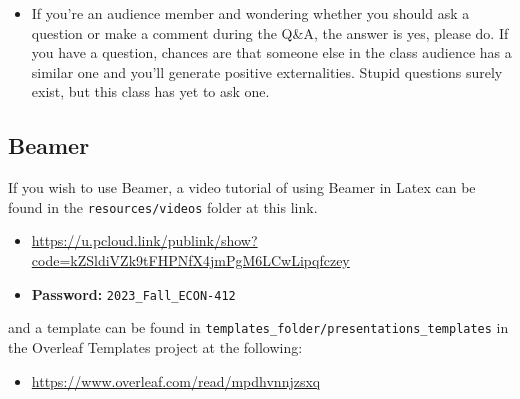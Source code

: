 \begin{itemize}
    \item If you're an audience member and wondering whether you should ask a question or make a comment during the Q\&A, the answer is yes, please do. If you have a question, chances are that someone else in the class audience has a similar one and you'll generate positive externalities. Stupid questions surely exist, but this class has yet to ask one. 
\end{itemize}

\subsection{Beamer}\label{sec:beamer}
If you wish to use Beamer, a video tutorial of using Beamer in Latex can be found in the \verb+resources/videos+ folder at this link.

\begin{itemize}
    \item \href{https://u.pcloud.link/publink/show?code=kZSldiVZk9tFHPNfX4jmPgM6LCwLipqfczey}{https://u.pcloud.link/publink/show?code=kZSldiVZk9tFHPNfX4jmPgM6LCwLipqfczey}
    \item \textbf{Password:} \verb+2023_Fall_ECON-412+
\end{itemize}

and a template can be found in \texttt{templates\_folder/presentations\_templates} in the Overleaf Templates project at the following:

\begin{itemize}
    \item \href{https://www.overleaf.com/read/mpdhvnnjzsxq}{https://www.overleaf.com/read/mpdhvnnjzsxq}
\end{itemize}